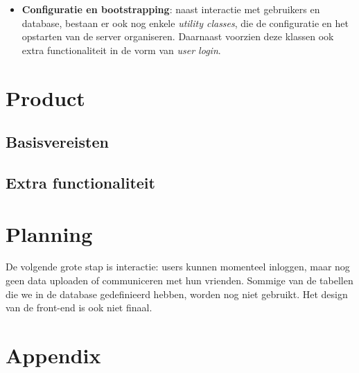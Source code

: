 \documentclass[12pt,a4paper]{article}
\begin{document}
\begin{itemize}
\item \textbf{Configuratie en bootstrapping}: naast interactie met gebruikers en database, bestaan er ook nog enkele \emph{utility classes}, die de configuratie en het opstarten van de server organiseren. Daarnaast voorzien deze klassen ook extra functionaliteit in de vorm van \emph{user login}. 

\end{itemize}

\section{Product}

\subsection{Basisvereisten}

\subsection{Extra functionaliteit}

\section{Planning}
De volgende grote stap is interactie: users kunnen momenteel inloggen, maar nog
geen data uploaden of communiceren met hun vrienden. Sommige van de tabellen 
die we in de database gedefinieerd hebben, worden nog niet gebruikt. Het design 
van de front-end is ook niet finaal.

\section{Appendix}
\end{document}
